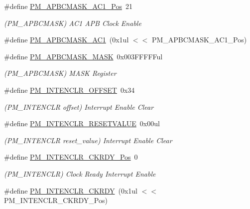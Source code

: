 \begin{DoxyCompactItemize}
\item 
\#define \mbox{\hyperlink{group___s_a_m_d21___p_m_gab243c60f569eeb2f4706793ede8bc44a}{P\+M\+\_\+\+A\+P\+B\+C\+M\+A\+S\+K\+\_\+\+A\+C1\+\_\+\+Pos}}~21
\begin{DoxyCompactList}\small\item\em (P\+M\+\_\+\+A\+P\+B\+C\+M\+A\+SK) A\+C1 A\+PB Clock Enable \end{DoxyCompactList}\item 
\#define \mbox{\hyperlink{group___s_a_m_d21___p_m_ga22dc42c08c05731edbef01799cdf7b11}{P\+M\+\_\+\+A\+P\+B\+C\+M\+A\+S\+K\+\_\+\+A\+C1}}~(0x1ul $<$$<$ P\+M\+\_\+\+A\+P\+B\+C\+M\+A\+S\+K\+\_\+\+A\+C1\+\_\+\+Pos)
\item 
\#define \mbox{\hyperlink{group___s_a_m_d21___p_m_ga0d5cdb44162fa86e4e0f5cce6b84ac63}{P\+M\+\_\+\+A\+P\+B\+C\+M\+A\+S\+K\+\_\+\+M\+A\+SK}}~0x003\+F\+F\+F\+F\+Ful
\begin{DoxyCompactList}\small\item\em (P\+M\+\_\+\+A\+P\+B\+C\+M\+A\+SK) M\+A\+SK Register \end{DoxyCompactList}\item 
\#define \mbox{\hyperlink{group___s_a_m_d21___p_m_ga96e613f029988a0e97e71761daab56d8}{P\+M\+\_\+\+I\+N\+T\+E\+N\+C\+L\+R\+\_\+\+O\+F\+F\+S\+ET}}~0x34
\begin{DoxyCompactList}\small\item\em (P\+M\+\_\+\+I\+N\+T\+E\+N\+C\+LR offset) Interrupt Enable Clear \end{DoxyCompactList}\item 
\#define \mbox{\hyperlink{group___s_a_m_d21___p_m_ga6af1e46f631f08562f2affcba415c69c}{P\+M\+\_\+\+I\+N\+T\+E\+N\+C\+L\+R\+\_\+\+R\+E\+S\+E\+T\+V\+A\+L\+UE}}~0x00ul
\begin{DoxyCompactList}\small\item\em (P\+M\+\_\+\+I\+N\+T\+E\+N\+C\+LR reset\+\_\+value) Interrupt Enable Clear \end{DoxyCompactList}\item 
\#define \mbox{\hyperlink{group___s_a_m_d21___p_m_ga4b738eba9a654ddff5a18ec8b92cf56f}{P\+M\+\_\+\+I\+N\+T\+E\+N\+C\+L\+R\+\_\+\+C\+K\+R\+D\+Y\+\_\+\+Pos}}~0
\begin{DoxyCompactList}\small\item\em (P\+M\+\_\+\+I\+N\+T\+E\+N\+C\+LR) Clock Ready Interrupt Enable \end{DoxyCompactList}\item 
\#define \mbox{\hyperlink{group___s_a_m_d21___p_m_ga6925a216f9bedf9d02e899eec20790ac}{P\+M\+\_\+\+I\+N\+T\+E\+N\+C\+L\+R\+\_\+\+C\+K\+R\+DY}}~(0x1ul $<$$<$ P\+M\+\_\+\+I\+N\+T\+E\+N\+C\+L\+R\+\_\+\+C\+K\+R\+D\+Y\+\_\+\+Pos)

\end{DoxyCompactItemize}
